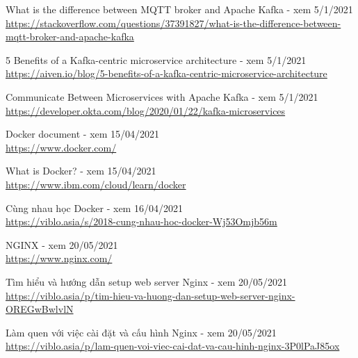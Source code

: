 \documentclass[12pt,a4paper,oneside]{book}
\begin{document}
\begin{thebibliography}{80}
        \bibitem{} What is the difference between MQTT broker and Apache Kafka - xem 5/1/2021\\
        \url{https://stackoverflow.com/questions/37391827/what-is-the-difference-between-mqtt-broker-and-apache-kafka}
        
        \bibitem{} 5 Benefits of a Kafka-centric microservice architecture - xem 5/1/2021\\
        \url{https://aiven.io/blog/5-benefits-of-a-kafka-centric-microservice-architecture}
        
        \bibitem{} Communicate Between Microservices with Apache Kafka - xem 5/1/2021\\
        \url{https://developer.okta.com/blog/2020/01/22/kafka-microservices}
        
        \bibitem{} Docker document - xem 15/04/2021\\
        \url{https://www.docker.com/}
        
        \bibitem{} What is Docker? - xem 15/04/2021\\
        \url{https://www.ibm.com/cloud/learn/docker}
        
        \bibitem{} Cùng nhau học Docker - xem 16/04/2021\\
        \url{https://viblo.asia/s/2018-cung-nhau-hoc-docker-Wj53Omjb56m}
        
        \bibitem{} NGINX - xem 20/05/2021\\
        \url{https://www.nginx.com/}
        
        \bibitem{} Tìm hiểu và hướng dẫn setup web server Nginx - xem 20/05/2021\\
        \url{https://viblo.asia/p/tim-hieu-va-huong-dan-setup-web-server-nginx-OREGwBwlvlN}
        
        \bibitem{} Làm quen với việc cài đặt và cấu hình Nginx - xem 20/05/2021\\
        \url{https://viblo.asia/p/lam-quen-voi-viec-cai-dat-va-cau-hinh-nginx-3P0lPaJ85ox}
        

    \end{thebibliography}
\end{document}
